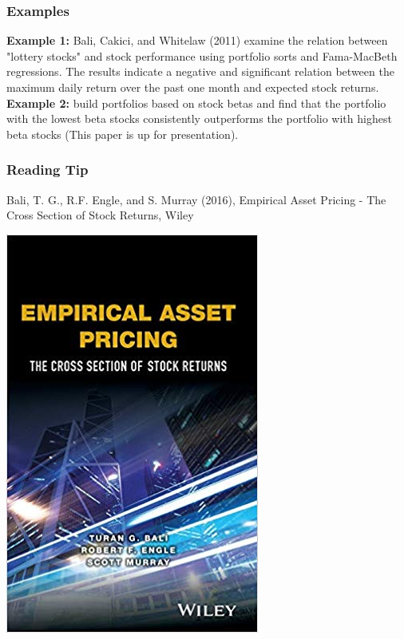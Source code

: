 \documentclass[xcolor=dvipsnames, english, 8pt]{beamer}
\begin{document}
\begin{frame}
    \frametitle{Examples}

\textbf{Example 1:} Bali, Cakici, and Whitelaw (2011) examine the relation between "lottery stocks" and stock performance using portfolio sorts and Fama-MacBeth regressions. The results indicate a negative and significant relation between the maximum daily return over the past one month and expected stock returns.\vspace{0.25cm}\\

    \textbf{Example 2:} \cite{Frazzini2014} build portfolios based on stock betas and find that the portfolio with the lowest beta stocks consistently outperforms the portfolio with highest beta stocks (This paper is up for presentation).
\end{frame}

\begin{frame}
    \frametitle{Reading Tip}
Bali, T. G., R.F. Engle, and S. Murray (2016), Empirical Asset Pricing - The Cross Section of Stock Returns, Wiley\vspace{0.35cm}\\
\begin{center}

    \includegraphics[scale=0.35]{Bali}
\end{center}
\end{frame}
\end{document}
